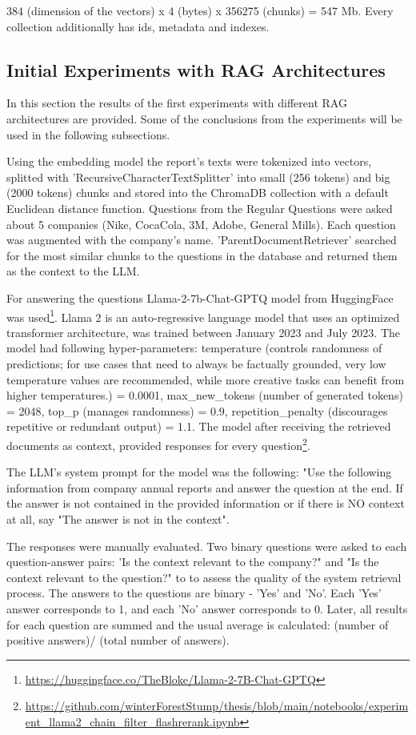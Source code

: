 384 (dimension of the vectors) x 4 (bytes) x 356275 (chunks) = 547 Mb. Every collection additionally has ids, metadata and indexes.


\subsection{Initial Experiments with RAG Architectures}
In this section the results of the first experiments with different RAG architectures are provided. Some of the conclusions from the experiments will be used in the following subsections.

Using the embedding model the report's texts were tokenized into vectors, splitted with 'RecursiveCharacterTextSplitter' into small (256 tokens) and big (2000 tokens) chunks and stored into the ChromaDB collection with a default Euclidean distance function. Questions from the Regular Questions were asked about 5 companies (Nike, CocaCola, 3M, Adobe, General Mills). Each question was augmented with the company's name. 'ParentDocumentRetriever' searched for the most similar chunks to the questions in the database and returned them as the context to the LLM.

For answering the questions Llama-2-7b-Chat-GPTQ model from HuggingFace was used\footnote{\url{https://huggingface.co/TheBloke/Llama-2-7B-Chat-GPTQ}}. Llama 2 is an auto-regressive language model that uses an optimized transformer architecture, was trained between January 2023 and July 2023. The model had following hyper-parameters: temperature (controls randomness of predictions; for use cases that need to always be factually grounded, very low temperature values are recommended, while more creative tasks can benefit from higher temperatures.) = 0.0001, max\_new\_tokens (number of generated tokens) = 2048, top\_p (manages randomness) = 0.9, repetition\_penalty (discourages repetitive or redundant output) = 1.1. The model after receiving the retrieved documents as context, provided responses for every question\footnote{\url{https://github.com/winterForestStump/thesis/blob/main/notebooks/experiment_llama2_chain_filter_flashrerank.ipynb}}. 

The LLM's system prompt for the model was the following: "Use the following information from company annual reports and answer the question at the end. If the answer is not contained in the provided information or if there is NO context at all, say "The answer is not in the context". 

The responses were manually evaluated. Two binary questions were asked to each question-answer pairs: 'Is the context relevant to the company?" and "Is the context relevant to the question?" to to assess the quality of the system retrieval process. The answers to the questions are binary - 'Yes' and 'No'. Each 'Yes' answer corresponds to 1, and each 'No' answer corresponds to 0. Later, all results for each question are summed and the usual average is calculated: (number of positive answers)/ (total number of answers).

